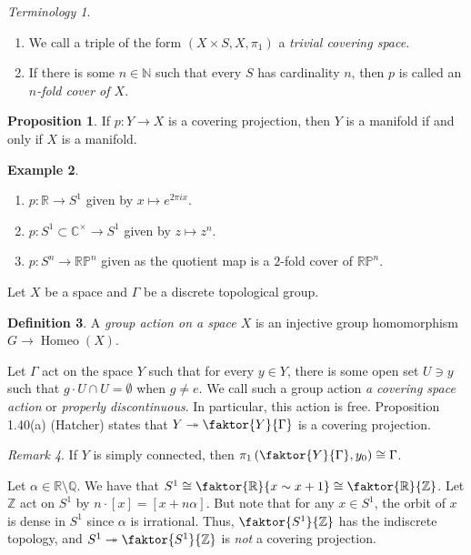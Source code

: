 \documentclass[10pt,letterpaper,cm]{nupset}
\theoremstyle{definition}
\newtheorem{definition}{Definition}[subsection]
\newtheorem{exmp}[definition]{Example}
\theoremstyle{theorem}
\newtheorem{prop}[definition]{Proposition}
\theoremstyle{remark}
\newtheorem{remark}[definition]{Remark}
\newtheorem*{term}{Terminology}
\newcommand{\C}{\mathbb C}
\newcommand{\N}{\mathbb N}
\newcommand{\Q}{\mathbb Q}
\newcommand{\R}{\mathbb{R}}
\newcommand{\RP}{\mathbb{RP}}
\newcommand{\Z}{\mathbb Z}
\newcommand{\1}{\mathbb{1}}
\newcommand{\0}{\vec 0}
\DeclareMathOperator{\homeo}{Homeo}
\begin{document}
\begin{term} $ $
\begin{enumerate}
\item 
We call a triple of the form $\left(X \times S, X, \pi_1\right)$ a \textit{trivial covering space}.
\item  If there is some $n\in \N$ such that every $S$ has cardinality $n$, then $p$ is called an \textit{$n$-fold cover of $X$}.
\end{enumerate}
\end{term}

\begin{prop}
If $p: Y \to X$ is a covering projection, then $Y$ is a manifold if and only if $X$ is a manifold. 
\end{prop}

\begin{exmp} $ $
\begin{enumerate}
\item $p : \R \to S^1$ given by $x \mapsto e^{2\pi ix}$.
\item $p: S^1\subset \C^{\times} \to S^1$ given by $z \mapsto z^n$.
\item $p: S^n \to \RP^n$ given as the quotient map is a $2$-fold cover of $\RP^n$.
\end{enumerate}
\end{exmp}

\smallskip

Let $X$ be a space and $\Gamma$ be a discrete topological group. 
\begin{definition}
A \textit{group action on a space $X$} is an injective group homomorphism $G \to \homeo(X)$.
\end{definition}
Let $\Gamma$ act on the space $Y$ such that for every $y\in Y$, there is some open set $U\ni y$ such that $g\cdot U \cap U =\emptyset$ when $g\ne e$. We call such a group action \textit{a covering space action} or \textit{properly discontinuous}. In particular, this action is free.  Proposition 1.40(a) (Hatcher) states that $Y \twoheadrightarrow \faktor{Y}{\Gamma}$ is a covering projection.

\begin{remark}\label{actiso}
If $Y$ is simply connected, then $\pi_1 \left(\faktor{Y}{\Gamma} , y_0 \right) \cong \Gamma$.
\end{remark}

Let $\alpha \in \R\setminus \Q$. We have that $S^1 \cong \faktor{\R}{x\sim x+1} \cong \faktor{\R}{\Z}$. Let $\Z$ act on $S^1$ by $n\cdot \left[x\right] = \left[x + n \alpha\right]$. But note that for any $x\in S^1$, the orbit of $x$ is dense in $S^1$ since $\alpha$ is irrational. Thus, $\faktor{S^1}{\Z}$ has the indiscrete topology, and $S^1 \twoheadrightarrow \faktor{S^1}{\Z}$ is \emph{not} a covering projection.
\end{document}
